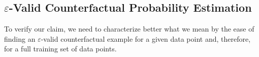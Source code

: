 




\subsection{$\varepsilon$-Valid Counterfactual Probability Estimation}
\label{subsec:epsilon-VCF}
To verify our claim, we need to characterize better what we mean by the ease of finding an $\varepsilon$-valid counterfactual example for a given data point and, therefore, for a full training set of data points.

